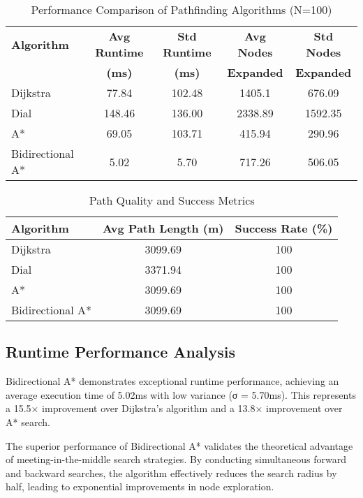 \documentclass[conference]{IEEEtran}
\begin{document}
\begin{table}[htbp]
\caption{Performance Comparison of Pathfinding Algorithms (N=100)}
\begin{center}
\begin{tabular}{|l|c|c|c|c|}
\hline
\textbf{Algorithm} & \textbf{Avg Runtime} & \textbf{Std Runtime} & \textbf{Avg Nodes} & \textbf{Std Nodes} \\
& \textbf{(ms)} & \textbf{(ms)} & \textbf{Expanded} & \textbf{Expanded} \\
\hline
Dijkstra & 77.84 & 102.48 & 1405.1 & 676.09 \\
\hline
Dial & 148.46 & 136.00 & 2338.89 & 1592.35 \\
\hline
A* & 69.05 & 103.71 & 415.94 & 290.96 \\
\hline
Bidirectional A* & 5.02 & 5.70 & 717.26 & 506.05 \\
\hline
\end{tabular}
\end{center}
\label{tab:performance}
\end{table}

\begin{table}[htbp]
\caption{Path Quality and Success Metrics}
\begin{center}
\begin{tabular}{|l|c|c|}
\hline
\textbf{Algorithm} & \textbf{Avg Path Length (m)} & \textbf{Success Rate (\%)} \\
\hline
Dijkstra & 3099.69 & 100 \\
\hline
Dial & 3371.94 & 100 \\
\hline
A* & 3099.69 & 100 \\
\hline
Bidirectional A* & 3099.69 & 100 \\
\hline
\end{tabular}
\end{center}
\label{tab:quality}
\end{table}

\subsection{Runtime Performance Analysis}

Bidirectional A* demonstrates exceptional runtime performance, achieving an average execution time of 5.02ms with low variance (σ = 5.70ms). This represents a 15.5× improvement over Dijkstra's algorithm and a 13.8× improvement over A* search.

The superior performance of Bidirectional A* validates the theoretical advantage of meeting-in-the-middle search strategies. By conducting simultaneous forward and backward searches, the algorithm effectively reduces the search radius by half, leading to exponential improvements in node exploration.
\end{document}
